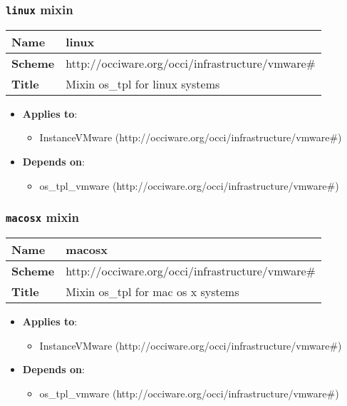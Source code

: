  
\subsubsection{\texttt{linux} mixin}
\begin{center}
\begin{tabular}{|l|l|}
  \hline
  \textbf{Name} & linux \\
  \hline  
  \textbf{Scheme} & http://occiware.org/occi/infrastructure/vmware\# \\
  \hline
  \textbf{Title} & Mixin os\_tpl for linux systems \\
  \hline
\end{tabular}
\end{center}
\begin{itemize}
\item \textbf{Applies to}:
\begin{itemize}
	\item InstanceVMware (http://occiware.org/occi/infrastructure/vmware\#)
\end{itemize}
\end{itemize} 
\begin{itemize}
\item \textbf{Depends on}:
\begin{itemize}
	\item os\_tpl_vmware (http://occiware.org/occi/infrastructure/vmware\#)
\end{itemize}
\end{itemize}



 
\subsubsection{\texttt{macosx} mixin}
\begin{center}
\begin{tabular}{|l|l|}
  \hline
  \textbf{Name} & macosx \\
  \hline  
  \textbf{Scheme} & http://occiware.org/occi/infrastructure/vmware\# \\
  \hline
  \textbf{Title} & Mixin os\_tpl for mac os x systems \\
  \hline
\end{tabular}
\end{center}
\begin{itemize}
\item \textbf{Applies to}:
\begin{itemize}
	\item InstanceVMware (http://occiware.org/occi/infrastructure/vmware\#)
\end{itemize}
\end{itemize} 
\begin{itemize}
\item \textbf{Depends on}:
\begin{itemize}
	\item os\_tpl_vmware (http://occiware.org/occi/infrastructure/vmware\#)
\end{itemize}
\end{itemize}



